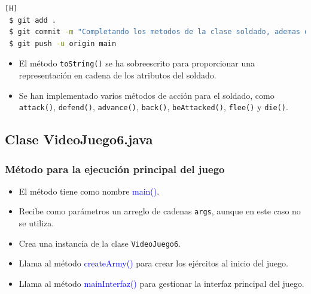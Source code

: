 \documentclass{article}
\begin{document}
\begin{lstlisting}[language=bash,caption={Commit \href{https://github.com/hernanchoquehuanca/fp2-23b/commit/7c8c0c01d6e76ec195678846c285f0a2c8c58101}{7c8c0c0}: Se  completaron métodos que se utilizarán en la clase principal VideoJuego6.java}][H]
 $ git add .
 $ git commit -m "Completando los metodos de la clase soldado, ademas de adaptar el contructor principal"			
 $ git push -u origin main
\end{lstlisting}

\newpage %

\begin{itemize}
    \item El método \texttt{toString()} se ha sobreescrito para proporcionar una representación en cadena de los atributos del soldado.
\end{itemize}



\begin{itemize}
    \item Se han implementado varios métodos de acción para el soldado, como \texttt{attack()}, \texttt{defend()}, \texttt{advance()}, \texttt{back()}, \texttt{beAttacked()}, \texttt{flee()} y \texttt{die()}.
\end{itemize}


  
\newpage %

\subsection{Clase VideoJuego6.java}


\subsubsection{Método para la ejecución principal del juego}

\begin{itemize}
    \item El método tiene como nombre \textcolor{blue}{main()}.
    \item Recibe como parámetros un arreglo de cadenas \texttt{args}, aunque en este caso no se utiliza.
    \item Crea una instancia de la clase \texttt{VideoJuego6}.
    \item Llama al método \textcolor{blue}{createArmy()} para crear los ejércitos al inicio del juego.
    \item Llama al método \textcolor{blue}{mainInterfaz()} para gestionar la interfaz principal del juego.
\end{itemize}

\end{document}
